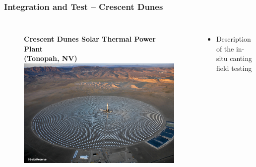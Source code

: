 \documentclass[aspectratio=169]{beamer}
\begin{document}
\begin{frame}
  \frametitle{Integration and Test -- Crescent Dunes}
  \begin{columns}[c]
    \begin{figure}
      \textbf{Crescent Dunes Solar Thermal Power Plant\\
        (Tonopah, NV)}
      \includegraphics[width=\linewidth]{CDSEP.jpg}
    \end{figure}

    \begin{itemize}
    \item Description of the in-situ canting field testing
    \end{itemize}
  \end{columns}
\end{frame}
\end{document}
